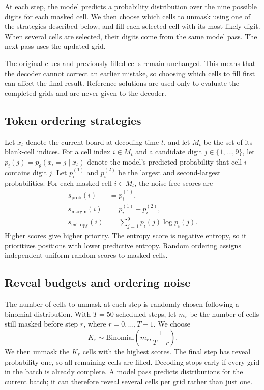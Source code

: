 \documentclass{article}
\begin{document}
At each step, the model predicts a probability distribution over the nine
possible digits for each masked cell. We then choose which cells to unmask
using one of the strategies described below, and fill each selected cell
with its most likely digit. When several cells are selected, their digits
come from the same model pass. The next pass uses the updated grid.

The original clues and previously filled cells remain unchanged. This means
that the decoder cannot correct an earlier mistake, so choosing which cells
to fill first can affect the final result. Reference solutions are used only
to evaluate the completed grids and are never given to the decoder.

\subsection{Token ordering strategies}
Let $x_t$ denote the current board at decoding time $t$, and let $M_t$ be the
set of its blank-cell indices. For a cell index $i\in M_t$ and a candidate
digit $j\in\{1,\ldots,9\}$, let $p_i(j)=p_\theta(x_i=j\mid x_t)$ denote
the model's predicted probability that cell $i$ contains digit $j$.
Let $p_i^{(1)}$ and $p_i^{(2)}$ be the largest and second-largest probabilities.
For each masked cell $i\in M_t$, the noise-free scores are
\begin{align*}
    s_{\mathrm{prob}}(i) &= p_i^{(1)}, \\
    s_{\mathrm{margin}}(i) &= p_i^{(1)}-p_i^{(2)}, \\
    s_{\mathrm{entropy}}(i) &= \sum_{j=1}^{9}p_i(j)\log p_i(j).
\end{align*}
Higher scores give higher priority. The entropy score is negative entropy,
so it prioritizes positions with lower predictive entropy.
Random ordering assigns independent uniform random scores to masked cells.

\subsection{Reveal budgets and ordering noise}
The number of cells to unmask at each step is randomly chosen following a
binomial distribution. With $T=50$ scheduled steps, let $m_r$ be the number
of cells still masked before step $r$, where $r=0,\ldots,T-1$. We choose
\[
    K_r\sim\mathrm{Binomial}\left(m_r,\frac{1}{T-r}\right).
\]
We then unmask the $K_r$ cells with the highest scores. The final step has
reveal probability one, so all remaining cells are filled. Decoding stops
early if every grid in the batch is already complete. A model pass predicts
distributions for the current batch; it can therefore reveal several cells
per grid rather than just one.
\end{document}

